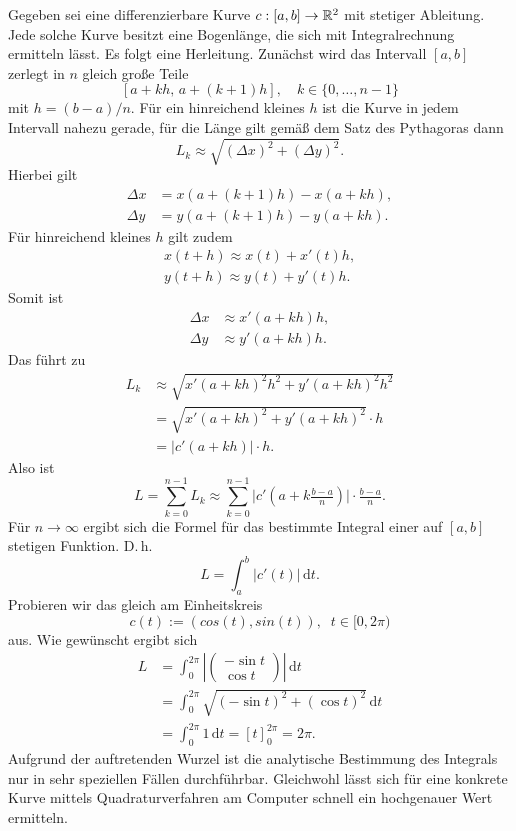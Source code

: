 Gegeben sei eine differenzierbare Kurve $c: [a,b]\to\mathbb R^2$ mit
stetiger Ableitung. Jede solche Kurve besitzt eine Bogenlänge, die sich
mit Integralrechnung ermitteln lässt. Es folgt eine Herleitung.
Zunächst wird das Intervall $[a,b]$ zerlegt in $n$ gleich große Teile
\[[a+kh,\,a+(k{+}1)h],\quad k\in\{0,\ldots,n-1\}\]
mit $h=(b-a)/n$. Für ein hinreichend kleines $h$ ist die Kurve in
jedem Intervall nahezu gerade, für die Länge gilt gemäß dem Satz des
Pythagoras dann
\begin{equation}
L_k \approx \sqrt{(\Delta x)^2+(\Delta y)^2}.
\end{equation}
Hierbei gilt
\begin{align*}
\Delta x &= x(a+(k{+}1)h)-x(a+kh),\\
\Delta y &= y(a+(k{+}1)h)-y(a+kh).
\end{align*}
Für hinreichend kleines $h$ gilt zudem
\begin{align*}
x(t+h) \approx x(t)+x'(t)h,\\
y(t+h) \approx y(t)+y'(t)h.
\end{align*}
Somit ist
\begin{align*}
\Delta x &\approx x'(a+kh)h,\\
\Delta y &\approx y'(a+kh)h.
\end{align*}
Das führt zu
\begin{align*}
L_k &\approx \sqrt{x'(a+kh)^2 h^2+y'(a+kh)^2 h^2}\\
&= \sqrt{x'(a+kh)^2+y'(a+kh)^2}\cdot h\\
&= |c'(a+kh)|\cdot h.
\end{align*}
Also ist
\begin{equation}
L = \sum_{k=0}^{n-1} L_k
\approx \sum_{k=0}^{n-1} \big|c'(a+k\tfrac{b-a}{n})\big|\cdot\tfrac{b-a}{n}.
\end{equation}
Für $n\to\infty$ ergibt sich die Formel für das bestimmte
Integral einer auf $[a,b]$ stetigen Funktion. D.\,h.%
\begin{equation}
L = \int_a^b |c'(t)|\,\mathrm dt.
\end{equation}
Probieren wir das gleich am Einheitskreis
\[c(t):=(cos(t),sin(t)),\;\;t\in{[0,2\pi)}\]
aus. Wie gewünscht ergibt sich
\begin{align*}
L &= \int_0^{2\pi} \left|\begin{pmatrix}-\sin t\\ \cos t\end{pmatrix}\right|\,\mathrm dt\\
&= \int_0^{2\pi} \sqrt{(-\sin t)^2+(\cos t)^2}\,\mathrm dt\\
&= \int_0^{2\pi} 1\,\mathrm dt = [t]_{0}^{2\pi} = 2\pi.
\end{align*}
Aufgrund der auftretenden Wurzel ist die analytische Bestimmung
des Integrals nur in sehr speziellen Fällen durchführbar.
Gleichwohl lässt sich für eine konkrete Kurve mittels
Quadraturverfahren am Computer schnell ein hochgenauer Wert ermitteln.

